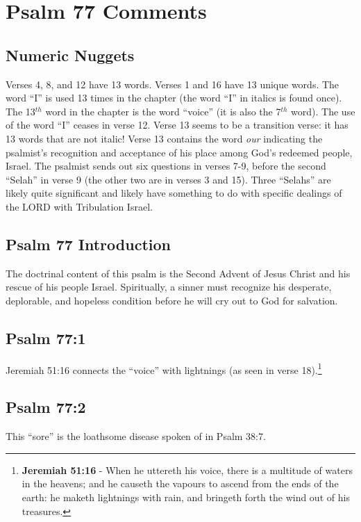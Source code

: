 \section{Psalm 77 Comments}

\subsection{Numeric Nuggets}
Verses 4, 8, and 12 have 13 words. Verses 1 and 16 have 13 unique words. The word ``I'' is used 13 times in the chapter (the word ``I'' in italics is found once). The 13$^{th}$ word in the chapter is the word ``voice'' (it is also the 7$^{th}$ word). The use of the word ``I'' ceases in verse 12. Verse 13 seems to be a transition verse: it has 13 words that are not italic! Verse 13 contains the word \emph{our} indicating the psalmist's recognition and acceptance of his place among God's redeemed people, Israel. The psalmist sends out six questions in verses 7-9, before the second ``Selah'' in verse 9 (the other two are in verses 3 and 15). Three ``Selahs'' are likely quite significant and likely have something to do with specific dealings of the LORD with Tribulation Israel.

\subsection{Psalm 77 Introduction}
The doctrinal content of this psalm is the Second Advent of Jesus Christ and his rescue of his people Israel. Spiritually, a sinner must recognize his desperate, deplorable, and hopeless condition before he will cry out to God for salvation. 

\subsection{Psalm 77:1}
Jeremiah 51:16 connects the ``voice'' with lightnings (as seen in verse 18).\footnote{\textbf{Jeremiah 51:16} - When he uttereth his voice, there is a multitude of waters in the heavens; and he causeth the vapours to ascend from the ends of the earth: he maketh lightnings with rain, and bringeth forth the wind out of his treasures.}

\subsection{Psalm 77:2}
This ``sore'' is the loathsome disease spoken of in Psalm 38:7.


